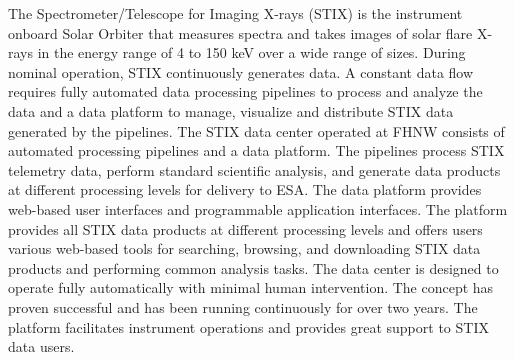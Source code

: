 \documentclass[referee]{preaa} %
\begin{document}
  \abstract
   { The Spectrometer/Telescope for Imaging X-rays (STIX) is the instrument onboard Solar Orbiter that measures spectra and 
   takes images of solar flare X-rays in the energy range of 4 to 150 keV over a wide range of sizes.} %
   {During nominal operation, STIX 
   continuously generates data. A constant data flow requires fully automated data processing pipelines to process and analyze the data and a data platform to manage, 
   visualize and distribute STIX data generated by the pipelines.
   }
   {
   The STIX data center operated at FHNW consists of automated processing pipelines and a data platform.  The pipelines process STIX telemetry data, perform standard scientific analysis, and generate data products at different processing levels for delivery to ESA. The data platform provides web-based user interfaces and programmable application interfaces. }
   {
   The platform provides all STIX data products at different processing levels and offers users various web-based tools for searching, browsing, and downloading STIX data products and performing common analysis tasks. The data center is designed to operate fully automatically with minimal human intervention. The concept has proven successful and has been running continuously for over two years. The platform facilitates instrument operations and provides great support to STIX data users.}
 {}
   \maketitle

\end{document}
